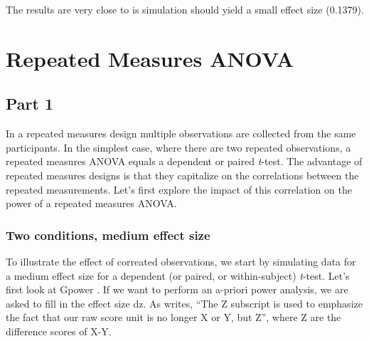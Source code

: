 \documentclass[
]{book}
\begin{document}
The results are very close to is simulation should yield a small effect size (0.1379).

\hypertarget{repeated-measures-anova}{%
\chapter{Repeated Measures ANOVA}\label{repeated-measures-anova}}

\hypertarget{part-1-1}{%
\section{Part 1}\label{part-1-1}}

In a repeated measures design multiple observations are collected from the same participants. In the simplest case, where there are two repeated observations, a repeated measures ANOVA equals a dependent or paired \emph{t}-test. The advantage of repeated measures designs is that they capitalize on the correlations between the repeated measurements. Let's first explore the impact of this correlation on the power of a repeated measures ANOVA.

\hypertarget{two-conditions-medium-effect-size}{%
\subsection{Two conditions, medium effect size}\label{two-conditions-medium-effect-size}}

To illustrate the effect of correated observations, we start by simulating data for a medium effect size for a dependent (or paired, or within-subject) \emph{t}-test. Let's first look at Gpower \citet{faul2007g}. If we want to perform an a-priori power analysis, we are asked to fill in the effect size dz. As \citet{cohen1988spa} writes, ``The Z subscript is used to emphasize the fact that our raw score unit is no longer X or Y, but Z'', where Z are the difference scores of X-Y.
\end{document}
